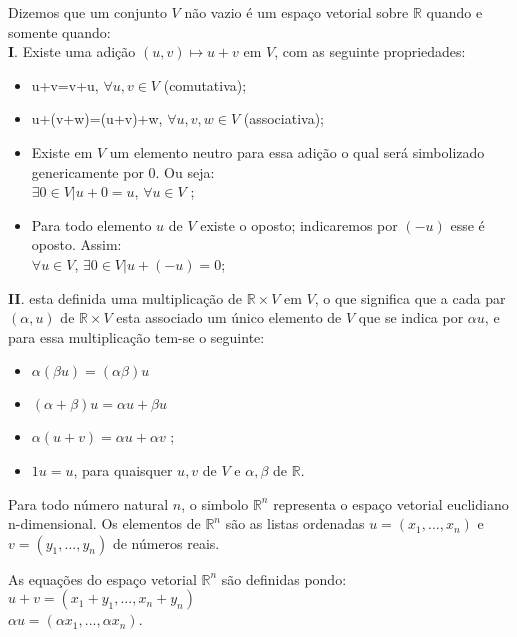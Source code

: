 \begin{df}
	Dizemos que um conjunto $V$ não vazio é um espaço vetorial sobre $ \mathbb{R}$ quando e somente quando:\\
	\textbf{I}. Existe uma adição $(u,v)\mapsto u+v$ em $V$, com as seguinte propriedades:
	\begin{itemize}
		\item u+v=v+u, $\forall u, v \in V$ (comutativa);
		\item u+(v+w)=(u+v)+w,  $\forall u, v, w \in V$ (associativa);
		\item Existe em $V$ um elemento neutro para essa adição o qual será simbolizado genericamente por $0$. Ou seja:\\
		$\exists 0\in V | u+0=u$, $\forall u \in V$ ;
		\item Para todo elemento $u$ de $V$ existe o oposto; indicaremos por $(-u)$ esse é oposto. Assim:\\
		$\forall u \in V$, $\exists 0\in V | u+(-u)=0$;
		
	\end{itemize}
	\textbf{II}. esta definida uma multiplicação de $\mathbb{R}\times V$ em $V$, o que significa que a cada par $(\alpha, u)$ de $\mathbb{R}\times V$ esta associado um único elemento de $V$ que se indica por $\alpha u$, e para essa multiplicação tem-se o seguinte:
	\begin{itemize}
		\item $\alpha(\beta u)=(\alpha\beta) u$ 
		\item $(\alpha+\beta)u=\alpha u +\beta u$
		\item $\alpha(u+v)=\alpha u+ \alpha v$ ;
		\item $1u=u$, para quaisquer $u, v$ de $V$ e $\alpha, \beta$ de $\mathbb{R}$.
		
	\end{itemize}
\end{df}
                                                      
\begin{ex}
Para todo número natural $n$, o simbolo $\mathbb{R}^{n}$ representa o espaço vetorial euclidiano n-dimensional. Os elementos de $\mathbb{R}^{n}$ são as listas ordenadas $u=\left( x_{1},...,x_{n}\right)$ e $v=\left(y_{1},...,y_{n} \right)$ de números reais.	
\end{ex}
As equações do espaço vetorial $\mathbb{R}^{n}$ são definidas pondo:\\
$u+v=\left(x_{1}+y_{1},...,x_{n}+y_{n}\right)$\\
$\alpha u=\left(\alpha x_{1},...,\alpha x_{n}\right)$.

